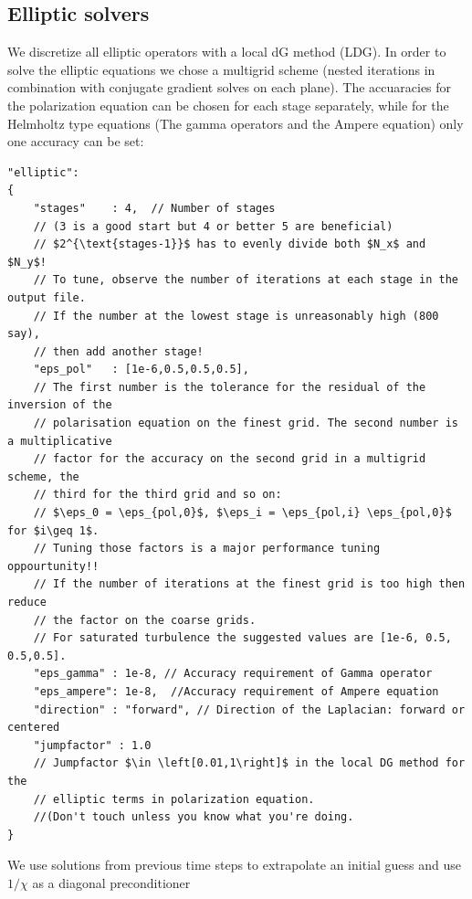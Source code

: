 \subsection{Elliptic solvers}
We discretize all elliptic operators with a local dG method (LDG).  In order to
solve the elliptic equations we chose a multigrid scheme (nested iterations in
combination with conjugate gradient solves on each plane). The accuaracies for
the polarization equation can be chosen for each stage separately, while for
the Helmholtz type equations (The gamma operators and the Ampere equation) only
one accuracy can be set:
\begin{verbatim}
"elliptic":
{
    "stages"    : 4,  // Number of stages
    // (3 is a good start but 4 or better 5 are beneficial)
    // $2^{\text{stages-1}}$ has to evenly divide both $N_x$ and $N_y$!
    // To tune, observe the number of iterations at each stage in the output file.
    // If the number at the lowest stage is unreasonably high (800 say),
    // then add another stage!
    "eps_pol"   : [1e-6,0.5,0.5,0.5],
    // The first number is the tolerance for the residual of the inversion of the
    // polarisation equation on the finest grid. The second number is a multiplicative
    // factor for the accuracy on the second grid in a multigrid scheme, the
    // third for the third grid and so on:
    // $\eps_0 = \eps_{pol,0}$, $\eps_i = \eps_{pol,i} \eps_{pol,0}$  for $i\geq 1$.
    // Tuning those factors is a major performance tuning oppourtunity!!
    // If the number of iterations at the finest grid is too high then reduce
    // the factor on the coarse grids.
    // For saturated turbulence the suggested values are [1e-6, 0.5, 0.5,0.5].
    "eps_gamma" : 1e-8, // Accuracy requirement of Gamma operator
    "eps_ampere": 1e-8,  //Accuracy requirement of Ampere equation
    "direction" : "forward", // Direction of the Laplacian: forward or centered
    "jumpfactor" : 1.0
    // Jumpfactor $\in \left[0.01,1\right]$ in the local DG method for the
    // elliptic terms in polarization equation.
    //(Don't touch unless you know what you're doing.
}
\end{verbatim}
\begin{tcolorbox}[title=Note]
    We use solutions from previous time steps to extrapolate an initial guess
    and use $1/\chi$ as a diagonal preconditioner
\end{tcolorbox}
